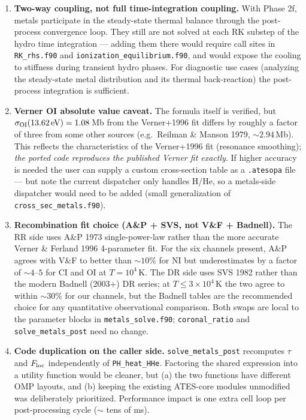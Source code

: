 \documentclass[english,a4paper]{kiseon_memo}
\begin{document}
\begin{enumerate}
\item \textbf{Two-way coupling, not full time-integration coupling.}
With Phase 2f, metals participate in the steady-state thermal balance
through the post-process convergence loop. They still are not solved
at each RK substep of the hydro time integration --- adding them
there would require call sites in \texttt{RK\_rhs.f90} and
\texttt{ionization\_equilibrium.f90}, and would expose the cooling
to stiffness during transient hydro phases. For diagnostic use cases
(analyzing the steady-state metal distribution and its thermal
back-reaction) the post-process integration is sufficient.

\item \textbf{Verner OI absolute value caveat.} The formula itself is
verified, but $\sigma_{\rm OI}(13.62\,\mathrm{eV}) = 1.08\,$Mb from the
Verner+1996 fit differs by roughly a factor of three from some other
sources (e.g.\ Reilman \& Manson 1979, $\sim 2.94\,$Mb). This reflects the
characteristics of the Verner+1996 fit (resonance smoothing); \emph{the
ported code reproduces the published Verner fit exactly}. If higher
accuracy is needed the user can supply a custom cross-section table as a
\texttt{.atesopa} file --- but note the current dispatcher only handles
H/He, so a metals-side dispatcher would need to be added (small
generalization of \texttt{cross\_sec\_metals.f90}).

\item \textbf{Recombination fit choice (A\&P + SVS, not V\&F + Badnell).}
The RR side uses A\&P 1973 single-power-law rather than the more
accurate Verner \& Ferland 1996 4-parameter fit. For the six channels
present, A\&P agrees with V\&F to better than $\sim 10\%$ for NI but
underestimates by a factor of $\sim 4$--$5$ for CI and OI at
$T = 10^4\,$K. The DR side uses SVS 1982 rather than the modern
Badnell (2003+) DR series; at $T \le 3 \times 10^4\,$K the two agree
to within $\sim 30\%$ for our channels, but the Badnell tables are
the recommended choice for any quantitative observational comparison.
Both swaps are local to the parameter blocks in
\texttt{metals\_solve.f90}; \texttt{coronal\_ratio} and
\texttt{solve\_metals\_post} need no change.

\item \textbf{Code duplication on the caller side.}
\texttt{solve\_metals\_post} recomputes $\tau$ and $F_{\rm loc}$
independently of \texttt{PH\_heat\_HHe}. Factoring the shared expression
into a utility function would be cleaner, but (a) the two functions have
different OMP layouts, and (b) keeping the existing ATES-core modules
unmodified was deliberately prioritized. Performance impact is one extra
cell loop per post-processing cycle ($\sim$ tens of ms).
\end{enumerate}
\end{document}
